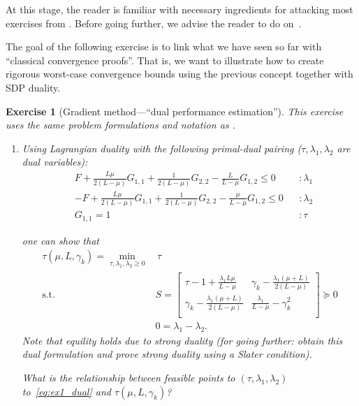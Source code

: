 \documentclass[11pt,a4paper]{article}
\newtheorem{exercise}{Exercise}
\begin{document}
At this stage, the reader is familiar with necessary ingredients for attacking most exercises from . Before going further, we advise the reader to do on~.

The goal of the following exercise is to link what we have seen so far with ``classical convergence proofs''. That is, we want to illustrate how to create rigorous worst-case convergence bounds using the previous concept together with SDP duality.

	\begin{exercise}[Gradient method---``dual performance estimation''] This exercise uses the same problem formulations and notation as .
	\begin{enumerate}
		\item Using Lagrangian duality with the following primal-dual pairing ($\tau,\lambda_1,\lambda_2$ are dual variables):
	\begin{equation*}
			\begin{aligned}
			& F + \tfrac{L\mu}{2(L-\mu)} G_{1,1}+\tfrac{1}{2(L-\mu)}G_{2,2}-\tfrac{L}{L-\mu}G_{1,2}\leqslant 0&&:\lambda_1\\
			&-F + \tfrac{L\mu}{2(L-\mu)} G_{1,1}+\tfrac{1}{2(L-\mu)}G_{2,2}-\tfrac{\mu}{L-\mu}G_{1,2}\leqslant 0&&:\lambda_2\\
			&G_{1,1}= 1&&:\tau
			\end{aligned}
			\end{equation*}
	
	 one can show that
		\begin{equation}\label{eq:ex1_dual}	 
		\begin{aligned}
			\tau(\mu,L,\gamma_k)=\min_{\tau,\lambda_1,\lambda_2\geqslant 0} & \,\tau\\
			\text{s.t. }& S=\begin{bmatrix}
				\tau-1+\frac{\lambda_1 L\mu}{L-\mu } & \gamma_k-\frac{\lambda_1 (\mu +L)}{2 (L-\mu )} \\
				\gamma_k-\frac{\lambda_1 (\mu +L)}{2 (L-\mu )} & \frac{\lambda_1}{L-\mu }-\gamma_k^2 \\
			\end{bmatrix}\succcurlyeq 0\\
			&0=\lambda_1-\lambda_2.
		\end{aligned}
		\end{equation}
	Note that equility holds due to strong duality (for going further: obtain this dual formulation and prove strong duality using a Slater condition). 
	
	What is the relationship between feasible points to $(\tau,\lambda_1,\lambda_2)$ to~\eqref{eq:ex1_dual} and $\tau(\mu,L,\gamma_k)$?
	

\end{enumerate}
\end{exercise}
\end{document}

